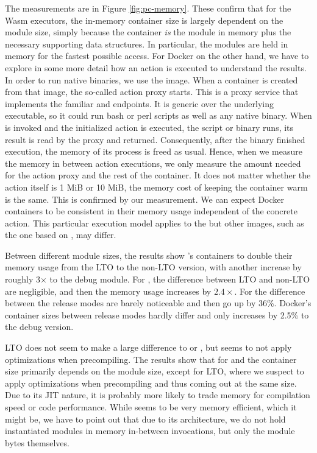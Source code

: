 The measurements are in Figure \ref{fig:pc-memory}. These confirm that for the Wasm executors, the in-memory container size is largely dependent on the module size, simply because the container \emph{is} the module in memory plus the necessary supporting data structures. In particular, the modules are held in memory for the fastest possible access. For Docker on the other hand, we have to explore in some more detail how an action is executed to understand the results. In order to run native binaries, we use the  image. When a container is created from that image, the so-called action proxy starts. This is a proxy service that implements the familiar  and  endpoints. It is generic over the underlying executable, so it could run bash or perl scripts as well as any native binary. When  is invoked and the initialized action is executed, the script or binary runs, its result is read by the proxy and returned. Consequently, after the binary finished execution, the memory of its process is freed as usual. Hence, when we measure the memory in between action executions, we only measure the amount needed for the action proxy and the rest of the container. It does not matter whether the action itself is 1 MiB or 10 MiB, the memory cost of keeping the container warm is the same. This is confirmed by our measurement. We can expect Docker containers to be consistent in their memory usage independent of the concrete action. This particular execution model applies to the  but other images, such as the one based on , may differ.

Between different module sizes, the results show 's containers to double their memory usage from the LTO to the non-LTO version, with another increase by roughly 3$\times$ to the debug module. For , the difference between LTO and non-LTO are negligible, and then the memory usage increases by $2.4\times$. For  the difference between the release modes are barely noticeable and then go up by 36\%. Docker's container sizes between release modes hardly differ and only increases by 2.5\% to the debug version.

LTO does not seem to make a large difference to  or , but  seems to not apply optimizations when precompiling.
The results show that for  and  the container size primarily depends on the module size, except for LTO, where we suspect  to apply optimizations when precompiling and thus coming out at the same size. Due to its JIT nature, it is probably more likely to trade memory for compilation speed or code performance.
While  seems to be very memory efficient, which it might be, we have to point out that due to its architecture, we do not hold instantiated modules in memory in-between  invocations, but only the module bytes themselves.

